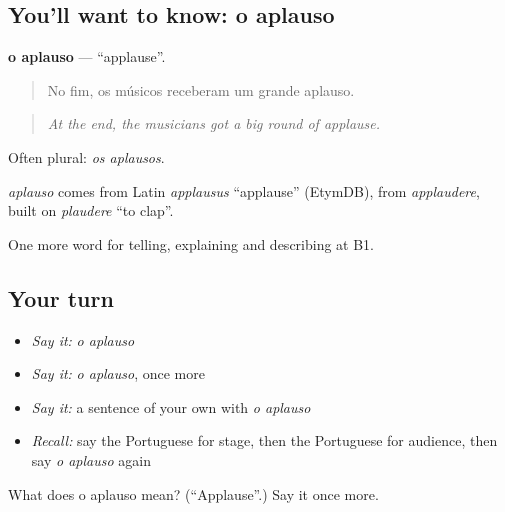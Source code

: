 \subsection*{You'll want to know: o aplauso}
\textbf{o aplauso} — \textquotedblleft{}applause\textquotedblright{}.

\begin{quote}
No fim, os músicos receberam um grande aplauso.
\end{quote}

\begin{quote}
\emph{At the end, the musicians got a big round of applause.}
\end{quote}

Often plural: \emph{os aplausos}.

\begin{cousinweb}
\emph{aplauso} comes from Latin \emph{applausus} \textquotedblleft{}applause\textquotedblright{} (EtymDB), from \emph{applaudere}, built on \emph{plaudere} \textquotedblleft{}to clap\textquotedblright{}.
\end{cousinweb}

\begin{grammarlens}[title={What you've built}]
One more word for telling, explaining and describing at B1.
\end{grammarlens}

\subsection*{Your turn}
\begin{itemize}
\raggedright
  \item \emph{Say it:} \emph{o aplauso}
  \item \emph{Say it:} \emph{o aplauso}, once more
  \item \emph{Say it:} a sentence of your own with \emph{o aplauso}
  \item \emph{Recall:} say the Portuguese for stage, then the Portuguese for audience, then say \emph{o aplauso} again
\end{itemize}

\begin{tcolorbox}[breakable,colback=teal!4,colframe=teal!35!black,title={Before you move on}]
What does o aplauso mean? (\textquotedblleft{}Applause\textquotedblright{}.) Say it once more.
\end{tcolorbox}
